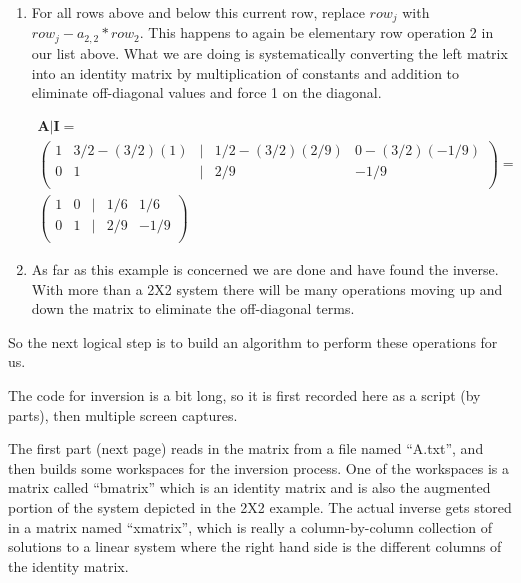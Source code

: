 \begin{enumerate}
\item For all rows above and below this current row, replace $row_j$ with $row_j - a_{2,2}*row_2$.  
This happens to again be elementary row operation 2 in our list above.  
What we are doing is systematically converting the left matrix into an identity matrix by multiplication of constants and addition to eliminate off-diagonal values and force 1 on the diagonal.

\begin{gather}
\mathbf{A} | \mathbf{I} = \\
\begin{pmatrix}
1 & 3/2 - (3/2)(1) & | & 1/2 - (3/2)(2/9) & 0-(3/2)(-1/9) \\
0 & 1 & | & 2/9 & -1/9 \\
\end{pmatrix}
= \\
\begin{pmatrix}
1 & 0 & | & 1/6 & 1/6 \\
0 & 1 & | & 2/9 & -1/9 \\
\end{pmatrix}
\end{gather}

\item As far as this example is concerned we are done and have found the inverse.  
With more than a 2X2 system there will be many operations moving up and down the matrix to eliminate the off-diagonal terms.
\end{enumerate}

So the next logical step is to build an algorithm to perform these operations for us.

The code for inversion is a bit long, so it is first recorded here as a script (by parts), then multiple screen captures.

The first part (next page) reads in the matrix from a file named ``A.txt'', and then builds some workspaces for the inversion process.
One of the workspaces is a matrix called ``bmatrix'' which is an identity matrix and is also the augmented portion of the system depicted in the 2X2 example.  The actual inverse gets stored in a matrix named ``xmatrix'', which is really a column-by-column collection of solutions to a linear system where the right hand side is the different columns of the identity matrix. 
 
